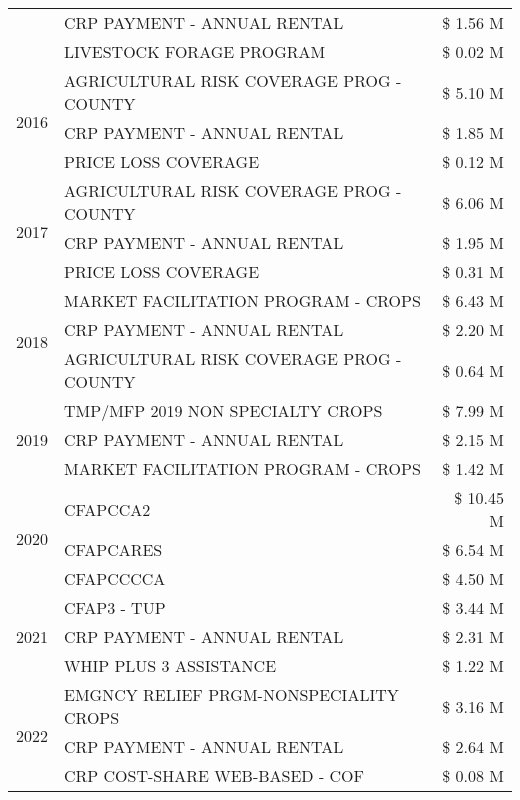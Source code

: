 \begin{tabular}{llr}
 & CRP PAYMENT - ANNUAL RENTAL & \$ 1.56 M \\
 & LIVESTOCK FORAGE PROGRAM & \$ 0.02 M \\
\cline{1-3}
\multirow[t]{3}{*}{2016} & AGRICULTURAL RISK COVERAGE PROG - COUNTY & \$ 5.10 M \\
 & CRP PAYMENT - ANNUAL RENTAL & \$ 1.85 M \\
 & PRICE LOSS COVERAGE & \$ 0.12 M \\
\cline{1-3}
\multirow[t]{3}{*}{2017} & AGRICULTURAL RISK COVERAGE PROG - COUNTY & \$ 6.06 M \\
 & CRP PAYMENT - ANNUAL RENTAL & \$ 1.95 M \\
 & PRICE LOSS COVERAGE & \$ 0.31 M \\
\cline{1-3}
\multirow[t]{3}{*}{2018} & MARKET FACILITATION PROGRAM - CROPS & \$ 6.43 M \\
 & CRP PAYMENT - ANNUAL RENTAL & \$ 2.20 M \\
 & AGRICULTURAL RISK COVERAGE PROG - COUNTY & \$ 0.64 M \\
\cline{1-3}
\multirow[t]{3}{*}{2019} & TMP/MFP 2019 NON SPECIALTY CROPS & \$ 7.99 M \\
 & CRP PAYMENT - ANNUAL RENTAL & \$ 2.15 M \\
 & MARKET FACILITATION PROGRAM - CROPS & \$ 1.42 M \\
\cline{1-3}
\multirow[t]{3}{*}{2020} & CFAPCCA2 & \$ 10.45 M \\
 & CFAPCARES & \$ 6.54 M \\
 & CFAPCCCCA & \$ 4.50 M \\
\cline{1-3}
\multirow[t]{3}{*}{2021} & CFAP3 - TUP & \$ 3.44 M \\
 & CRP PAYMENT - ANNUAL RENTAL & \$ 2.31 M \\
 & WHIP PLUS 3 ASSISTANCE & \$ 1.22 M \\
\cline{1-3}
\multirow[t]{3}{*}{2022} & EMGNCY RELIEF PRGM-NONSPECIALITY CROPS & \$ 3.16 M \\
 & CRP PAYMENT - ANNUAL RENTAL & \$ 2.64 M \\
 & CRP COST-SHARE WEB-BASED - COF & \$ 0.08 M \\
\cline{1-3}
\bottomrule
\end{tabular}
